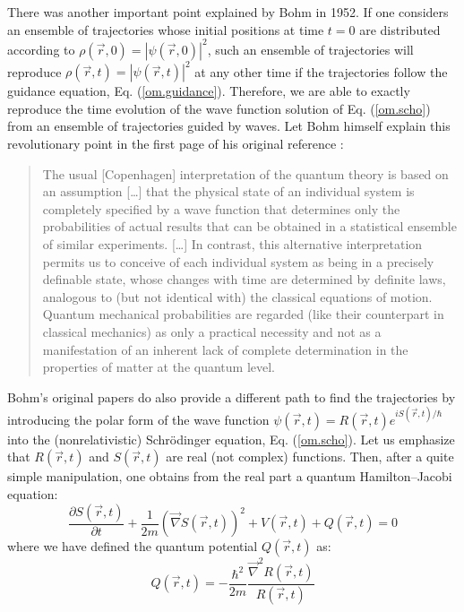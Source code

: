 \documentclass[nofootinbib, secnumarabic, amsmath, nobibnotes,11pt,aps,pra, floatfix]{revtex4-1}
\newcommand{\eref}[1]{Eq. (\ref{#1})}
\begin{document}
There was another important point explained by Bohm in 1952. If one considers an ensemble of trajectories whose initial positions at time $t = 0$ are distributed according to $\rho(\vec{r},0) = |\psi(\vec{r},0)|^2$, such an ensemble of trajectories will reproduce $\rho(\vec{r},t) = |\psi(\vec{r},t)|^2$ at any other time if the trajectories follow the guidance equation, \eref{om.guidance}. Therefore, we are able to exactly reproduce the time evolution of the wave function solution of \eref{om.scho} from an ensemble of trajectories guided by waves. Let Bohm himself explain this revolutionary point in the first page of his original reference \cite{om.bohm1952a}:\\
\begin{quote}
The usual [Copenhagen] interpretation of the quantum theory is based
on an assumption [\ldots] that the physical state of an individual
system is completely specified by a wave function that determines
only the probabilities of actual results that can be obtained in a
statistical ensemble of similar experiments. [\ldots] In contrast,
this alternative interpretation permits us to conceive of each
individual system as being in a precisely definable state, whose
changes with time are determined by definite laws, analogous to (but
not identical with) the classical equations of motion. Quantum
mechanical probabilities are regarded (like their counterpart in
classical mechanics) as only a practical necessity and not as a
manifestation of an inherent lack of complete determination in the
properties of matter at the quantum level.\\
\end{quote}
Bohm's original papers do also provide a different path to find the trajectories by
introducing the polar form of the wave function $\psi(\vec{r},t) =
R(\vec{r},t) e^{i S(\vec{r},t)/\hbar}$ into the (nonrelativistic)
Schr\"odinger equation, \eref{om.scho}. Let us emphasize that
$R(\vec{r},t)$ and $S(\vec{r},t)$ are real (not complex) functions. Then, after a
quite simple manipulation, one obtains from the real part a quantum
Hamilton--Jacobi equation:
\begin{equation}
\label{om.hamitlon2}
 \frac{\partial S(\vec{r},t)}{\partial t} + \frac{1}{2m} \left(\vec{\nabla} S(\vec{r},t)\right)^{2} + V(\vec{r},t) + Q(\vec{r},t) = 0
\end{equation}
where we have defined the quantum potential $Q(\vec{r},t)$ as:
\begin{equation}
\label{om.hamitlon3}
 Q(\vec{r},t) = -\frac{\hbar^{2}}{2 m} \frac{\vec{\nabla}^{2}R(\vec{r},t)}{R(\vec{r},t)}
\end{equation}
\end{document}
